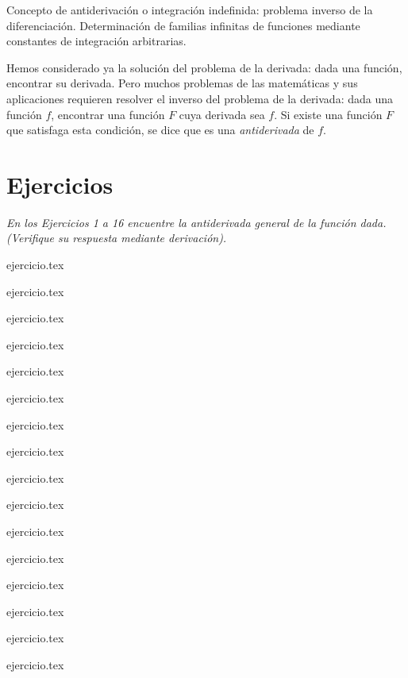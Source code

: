 
Concepto de antiderivación o integración indefinida: problema inverso de la diferenciación. Determinación de familias infinitas de funciones mediante constantes de integración arbitrarias.

Hemos considerado ya la solución del problema de la derivada: dada una función, encontrar su derivada. Pero muchos problemas de las matemáticas y sus aplicaciones requieren resolver el inverso del problema de la derivada: dada una función $f$, encontrar una función $F$ cuya derivada sea $f$. Si existe una función $F$ que satisfaga esta condición, se dice que es una \textit{antiderivada} de $f$.

\vspace{1em}
\begin{center}
\end{center}

\vspace{1.5em}
\section*{Ejercicios}

\noindent \textit{En los Ejercicios 1 a 16 encuentre la antiderivada general de la función dada. (Verifique su respuesta mediante derivación).}

\begin{enumerate}
    \begin{minipage}{0.45\textwidth}
    {ejercicio.tex}
    \addtocounter{enumi}{1}
    {ejercicio.tex}
    \addtocounter{enumi}{1}
    {ejercicio.tex}
    \addtocounter{enumi}{1}
    {ejercicio.tex}
    \addtocounter{enumi}{1}
    {ejercicio.tex}
    \addtocounter{enumi}{1}
    {ejercicio.tex}
    \addtocounter{enumi}{1}
    {ejercicio.tex}
    \addtocounter{enumi}{1}
    {ejercicio.tex}
    \end{minipage}%
    \begin{minipage}{0.45\textwidth}
    \setcounter{enumi}{1}
    {ejercicio.tex}
    \addtocounter{enumi}{1}
    {ejercicio.tex}
    \addtocounter{enumi}{1}
    {ejercicio.tex}
    \addtocounter{enumi}{1}
    {ejercicio.tex}
    \addtocounter{enumi}{1}
    {ejercicio.tex}
    \addtocounter{enumi}{1}
    {ejercicio.tex}
    \addtocounter{enumi}{1}
    {ejercicio.tex}
    \addtocounter{enumi}{1}
    {ejercicio.tex}
    \end{minipage}
\end{enumerate}

